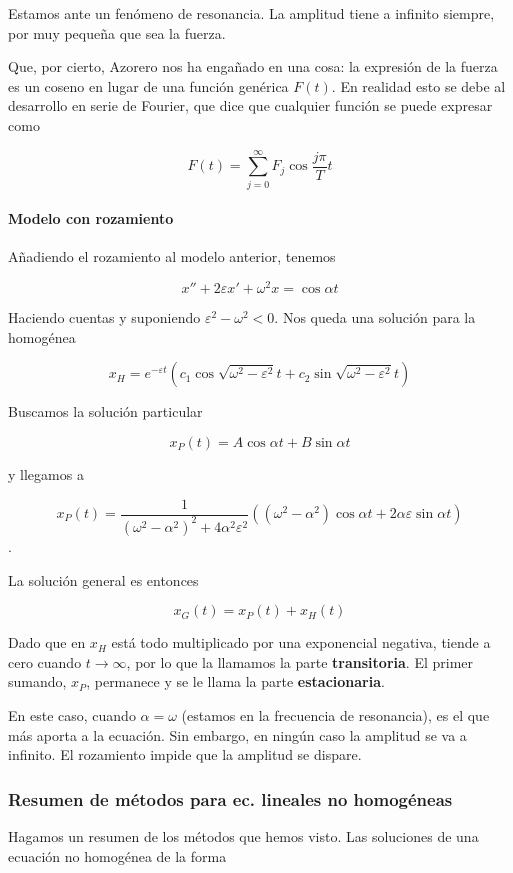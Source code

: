 Estamos ante un fenómeno de resonancia. La amplitud tiene a infinito siempre, por muy pequeña que sea la fuerza.

Que, por cierto, Azorero nos ha engañado en una cosa: la expresión de la fuerza es un coseno en lugar de una función genérica $F(t)$. En realidad esto se debe al desarrollo en serie de Fourier, que dice que cualquier función se puede expresar como 

\[ F(t) = \sum_{j=0}^∞ F_j \cos \frac{jπ}{T}t \]

\paragraph{Modelo con rozamiento}

Añadiendo el rozamiento al modelo anterior, tenemos

\[ x''+2εx'+ω^2x = \cos αt \]

Haciendo cuentas y suponiendo $ε^2-ω^2<0$. Nos queda una solución para la homogénea

\[ x_H = e^{-εt}\left(c_1 \cos \sqrt{ω^2-ε^2}t + c_2 \sin \sqrt{ω^2-ε^2}t\right) \]

Buscamos la solución particular

\[ x_P (t) = A\cos αt + B\sin αt \]

y llegamos a 

\[ x_P(t) = \frac{1}{(ω^2-α^2)^2 + 4α^2ε^2}\left((ω^2-α^2)\cos αt + 2αε \sin αt \right) \].

La solución general es entonces

\[ x_G(t) = x_P(t) + x_H(t) \]

Dado que en $x_H$ está todo multiplicado por una exponencial negativa, tiende a cero cuando $t\to ∞$, por lo que la llamamos la parte \textbf{transitoria}. El primer sumando, $x_P$, permanece y se le llama la parte \textbf{estacionaria}.

En este caso, cuando $α=ω$ (estamos en la frecuencia de resonancia), es el que más aporta a la ecuación. Sin embargo, en ningún caso la amplitud se va a infinito. El rozamiento impide que la amplitud se dispare.

\subsubsection{Resumen de métodos para ec. lineales no homogéneas}

Hagamos un resumen de los métodos que hemos visto. Las soluciones de una ecuación no homogénea de la forma

